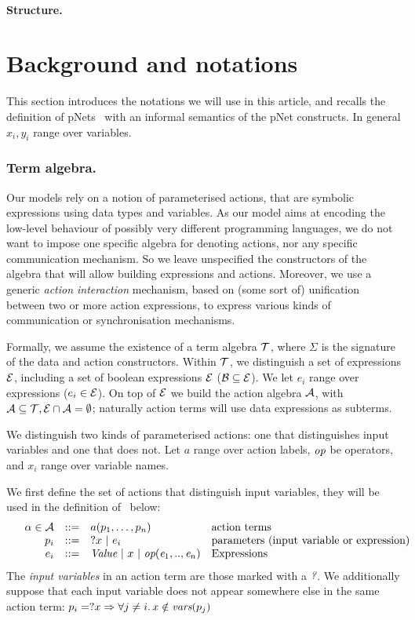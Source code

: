 \documentclass{lncs/llncs}
\newcommand{\TODO}[1]{\textcolor{red}{\textbf{[TODO:#1]}}}
\begin{document}
\paragraph{Structure.}


\section{Background and notations}
This section introduces the notations we will use in this article, and  recalls the definition of pNets~\cite{henrio:Forte2016} with an informal semantics  of the pNet constructs.
In general $x_i,y_i$ range over variables.
\subsubsection*{Term algebra.}
Our models rely on a notion of parameterised actions, that are
symbolic expressions using data types and variables. As our model aims
at encoding the low-level behaviour of possibly very different
programming languages, we do not want to impose one specific algebra
for denoting actions, nor any specific communication mechanism. So we
leave unspecified the constructors of the algebra that will allow building
expressions and actions. Moreover, we use a generic {\em action interaction}
mechanism, based on (some sort of) unification between two or more action
expressions, to express various kinds of communication or
synchronisation mechanisms.


Formally, we assume the existence of a term algebra $\mathcal{T}$,
where $\Sigma$ is the signature of the data and action constructors. Within $\mathcal{T}$, we distinguish a set of
 expressions $\mathcal{E}$, including a set of boolean
expressions $\mathcal{E}$ ($\mathcal{B}\subseteq\mathcal{E}$). We let $e_i$ range over expressions ($e_i\in\mathcal{E}$).
On top of $\mathcal{E}$ we build the action algebra
$\mathcal{A}$, with $\mathcal{A}\subseteq\mathcal{T},
\mathcal{E}\cap\mathcal{A}=\emptyset$;
naturally action terms will use data expressions as subterms.

We distinguish two kinds of parameterised actions: one that distinguishes input variables and one that does not. Let $a$
range over action labels, $\symb{op}$ be operators, and $x_i$ range over
variable names.

We first define the set of actions that distinguish input variables, they will be used in the definition of \pLTS\ below:
\[
\begin{array}[l]{rcl@{\quad}p{5.5cm}}
  \alpha\in\AlgA&::=&a(p_1,\ldots,p_n)&\text{action terms}\\
  p_i&::=& ?x~|~e_i&\text{parameters (input variable or expression)}\\
  e_i&::=& \symb{Value}~|~x~|~\symb{op}(\symb{e}_1,..,\symb{e}_n)&\text{Expressions}
\end{array}
\]
The \emph{input variables} in an action term are those marked with a
$\symb{?}$.
We additionally suppose that each input variable does not
appear somewhere else in the same action term:
$p_i=?x\Rightarrow\forall j\neq i.\, x\notin \vars(p_j)$
\end{document}
